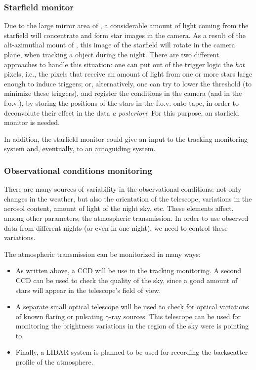 \subsubsection{Starfield monitor}
%
Due to the large mirror area of \MAGIC, a considerable amount of light
coming from the starfield will concentrate and form star images in the
camera. As a result of the alt-azimuthal mount of \MAGIC, this image
of the starfield will rotate in the camera plane, when tracking a
object during the night. There are two different approaches to handle
this situation: one can put out of the trigger logic the \emph{hot}
pixels, i.e., the pixels that receive an amount of light from one or
more stars large enough to induce triggers; or, alternatively, one can
try to lower the threshold (to minimize these triggers), and register
the conditions in the camera (and in the f.o.v.), by storing the
positions of the stars in the f.o.v. onto tape, in order to
deconvolute their effect in the data \emph{a posteriori}. For this
purpose, an starfield monitor is needed.

In addition, the starfield monitor could give an input to the tracking
monitoring system and, eventually, to an autoguiding system.

\subsubsection{Observational conditions monitoring}
%
There are many sources of variability in the observational conditions:
not only changes in the weather, but also the orientation of the
telescope, variations in the aerosol content, amount of light of the
night sky, etc.  These elements affect, among other parameters, the
atmospheric transmission. In order to use observed data from different
nights (or even in one night), we need to control these variations.

The atmospheric transmission can be monitorized in many ways:
\begin{itemize}
\item As written above, a CCD will be use in the tracking monitoring.
  A second CCD can be used to check the quality of the sky, since a
  good amount of stars will appear in the telescope's field of view.

\item A separate small optical telescope will be used to check for
  optical variations of known flaring or pulsating $\gamma$-ray
  sources. This telescope can be used for monitoring the brightness
  variations in the region of the sky were \MAGIC is pointing to.

\item Finally, a LIDAR system is planned to be used for recording the
  backscatter profile of the atmosphere.
\end{itemize}

